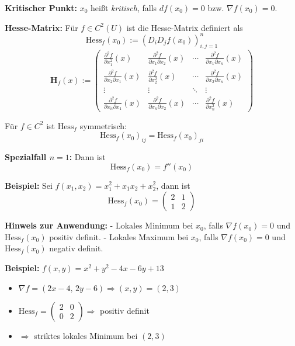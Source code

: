 \textbf{Kritischer Punkt:} $x_0$ heißt \textit{kritisch}, falls $df(x_0) = 0$ bzw. $\nabla f(x_0) = 0$.

\textbf{Hesse-Matrix:} Für $f \in C^2(U)$ ist die Hesse-Matrix definiert als
\[
\text{Hess}_f(x_0) := \left(D_i D_j f(x_0)\right)_{i,j=1}^n
\]
{\small
\[
\mathbf{H}_f(x) :=
\begin{pmatrix}
\frac{\partial^2 f}{\partial x_1^2}(x) & \frac{\partial^2 f}{\partial x_1 \partial x_2}(x) & \cdots & \frac{\partial^2 f}{\partial x_1 \partial x_n}(x) \\
\frac{\partial^2 f}{\partial x_2 \partial x_1}(x) & \frac{\partial^2 f}{\partial x_2^2}(x) & \cdots & \frac{\partial^2 f}{\partial x_2 \partial x_n}(x) \\
\vdots & \vdots & \ddots & \vdots \\
\frac{\partial^2 f}{\partial x_n \partial x_1}(x) & \frac{\partial^2 f}{\partial x_n \partial x_2}(x) & \cdots & \frac{\partial^2 f}{\partial x_n^2}(x)
\end{pmatrix}
\]
}


Für $f \in C^2$ ist $\text{Hess}_f$ symmetrisch:
\[
\text{Hess}_f(x_0)_{ij} = \text{Hess}_f(x_0)_{ji}
\]

\textbf{Spezialfall $n = 1$:} Dann ist
\[
\text{Hess}_f(x_0) = f''(x_0)
\]

\textbf{Beispiel:} Sei $f(x_1, x_2) = x_1^2 + x_1 x_2 + x_2^2$, dann ist
\[
\text{Hess}_f(x_0) = 
\begin{pmatrix}
2 & 1 \\
1 & 2
\end{pmatrix}
\]

\textbf{Hinweis zur Anwendung:}
- Lokales Minimum bei $x_0$, falls $\nabla f(x_0) = 0$ und $\text{Hess}_f(x_0)$ positiv definit.
- Lokales Maximum bei $x_0$, falls $\nabla f(x_0) = 0$ und $\text{Hess}_f(x_0)$ negativ definit.

\textbf{Beispiel:} \( f(x, y) = x^2 + y^2 - 4x - 6y + 13 \)

\begin{itemize}
  \item \( \nabla f = (2x - 4,\, 2y - 6) \Rightarrow (x, y) = (2, 3) \)
  \item \( \text{Hess}_f =
  \begin{pmatrix}
  2 & 0 \\
  0 & 2
  \end{pmatrix} \Rightarrow \) positiv definit
  \item \( \Rightarrow \) striktes lokales Minimum bei \( (2, 3) \)
\end{itemize}

